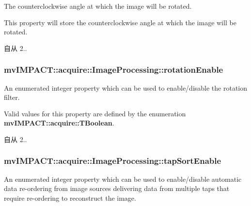 The counterclockwise angle at which the image will be rotated. 

This property will store the counterclockwise angle at which the image will be rotated.

\begin{DoxySince}{自从}
2.. 
\end{DoxySince}
\hypertarget{classmv_i_m_p_a_c_t_1_1acquire_1_1_image_processing_af56131c2b74e45d953aa6aa16d0959f8}{
\subsubsection[{rotation\+Enable}]{ mv\+I\+M\+P\+A\+C\+T\+::acquire\+::\+Image\+Processing\+::rotation\+Enable}}\label{classmv_i_m_p_a_c_t_1_1acquire_1_1_image_processing_af56131c2b74e45d953aa6aa16d0959f8}


An enumerated integer property which can be used to enable/disable the rotation filter. 

Valid values for this property are defined by the enumeration {\bfseries mv\+I\+M\+P\+A\+C\+T\+::acquire\+::\+T\+Boolean}.

\begin{DoxySince}{自从}
2.. 
\end{DoxySince}
\hypertarget{classmv_i_m_p_a_c_t_1_1acquire_1_1_image_processing_a6baedffb8af8bbd02452226028af8ce7}{
\subsubsection[{tap\+Sort\+Enable}]{ mv\+I\+M\+P\+A\+C\+T\+::acquire\+::\+Image\+Processing\+::tap\+Sort\+Enable}}\label{classmv_i_m_p_a_c_t_1_1acquire_1_1_image_processing_a6baedffb8af8bbd02452226028af8ce7}


An enumerated integer property which can be used to enable/disable automatic data re-\/ordering from image sources delivering data from multiple taps that require re-\/ordering to reconstruct the image. 

